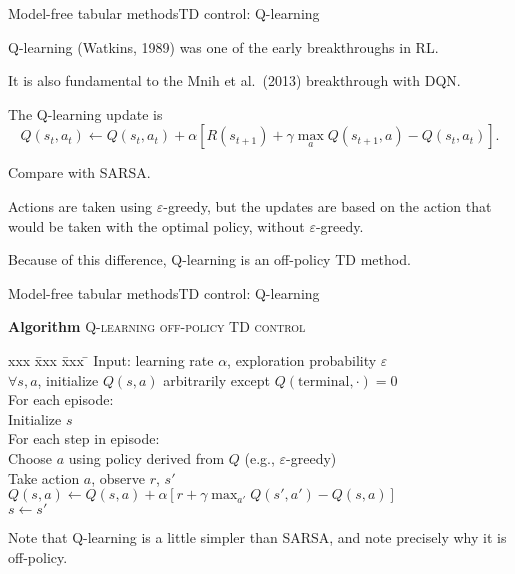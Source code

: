 \documentclass{beamer}
\begin{document}
\begin{frame}{Model-free tabular methods}{TD control: Q-learning}

  \alert{Q-learning} (Watkins, 1989) was one of the early
  breakthroughs in RL.

  \medskip

  It is also fundamental to the Mnih et al.\ (2013) breakthrough with DQN.

  \medskip

  The Q-learning update is
  $$Q(s_t,a_t) \leftarrow Q(s_t,a_t) + \alpha \left[ R(s_{t+1}) + \gamma
    \max_a Q(s_{t+1},a) - Q(s_t,a_t) \right]. $$

  \medskip

  Compare with SARSA.

  \medskip
  
  Actions are taken using $\varepsilon$-greedy, but the updates are
  based on the action that would be taken with the optimal policy,
  without $\varepsilon$-greedy.

  \medskip

  Because of this difference, Q-learning is an \alert{off-policy} TD
  method.

\end{frame}


\begin{frame}{Model-free tabular methods}{TD control: Q-learning}
  
  \begin{block}{\textbf{Algorithm} \textsc{Q-learning off-policy TD control}}
  \begin{tabbing}
    xxx \= xxx \= xxx \= \kill
    \> Input: learning rate $\alpha$, exploration probability $\varepsilon$ \\
    \> $\forall s, a$, initialize $Q(s,a)$ arbitrarily
    except $Q(\mathrm{terminal},\cdot) = 0$ \\
    \> For each episode: \\
    \> \> Initialize $s$ \\
    \> \> For each step in episode: \\
    \> \> \> Choose $a$ using policy derived from $Q$ (e.g., $\varepsilon$-greedy) \\
    \> \> \> Take action $a$, observe $r$, $s'$ \\
    \> \> \> $Q(s,a) \leftarrow Q(s,a) + \alpha \left[ r + \gamma \max_{a'} Q(s', a') - Q(s, a) \right]$ \\
    \> \> \> $s \leftarrow s'$
  \end{tabbing}
  \end{block}

  \medskip
  
  Note that Q-learning is a little simpler than SARSA, and note
  precisely why it is off-policy.

\end{frame}
\end{document}

